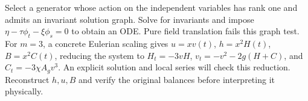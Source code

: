 \documentclass[12pt,a4paper]{article}
\begin{document}
Select a generator whose action on the independent variables has rank one and admits an invariant solution graph. Solve for invariants and impose $\eta-\tau\phi_t-\xi\phi_s=0$ to obtain an ODE. Pure field translation fails this graph test. For $m=3$, a concrete Eulerian scaling gives $u=xv(t)$, $h=x^2H(t)$, $B=x^2C(t)$, reducing the system to $H_t=-3vH$, $v_t=-v^2-2g(H+C)$, and $C_t=-3\chi A_gv^3$. An explicit solution and local series will check this reduction. Reconstruct $h,u,B$ and verify the original balances before interpreting it physically.
\end{document}
